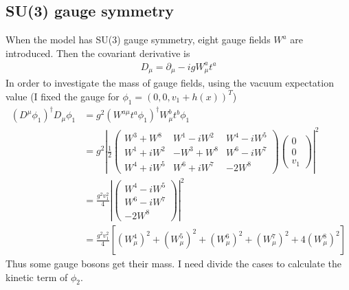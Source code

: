 \subsection{SU(3) gauge symmetry}
When the model has SU(3) gauge symmetry, eight gauge fields $W^a$ are introduced. Then the covariant derivative is
\begin{align*}
    D_{\mu}=\partial_{\mu}-igW^a_{\mu}t^a
\end{align*}
In order to investigate the mass of gauge fields, using the vacuum expectation value (I fixed the gauge for $\phi_1=(0,0,v_1+h(x))^T$)
\begin{align*}
    (D^{\mu}\phi_1)^{\dag}D_{\mu}\phi_1&=g^2(W^{a\mu}t^a\phi_1)^{\dag}W^b_{\mu}t^b\phi_1\\
    &=g^2\left|\frac{1}{2}\begin{pmatrix}
        W^3+W^8&W^1-iW^2&W^4-iW^5\\
        W^1+iW^2&-W^3+W^8&W^6-iW^7\\
        W^4+iW^5&W^6+iW^7&-2W^8
    \end{pmatrix}\begin{pmatrix}
        0\\0\\v_1
    \end{pmatrix}\right|^2\\
    &=\frac{g^2v_1^2}{4}\left|\begin{pmatrix}
        W^4-iW^5\\W^6-iW^7\\-2W^8
    \end{pmatrix}\right|^2\\
    &=\frac{g^2v_1^2}{4}\left[(W^4_{\mu})^2+(W^5_{\mu})^2+(W^6_{\mu})^2+(W^7_{\mu})^2+4(W^8_{\mu})^2\right]
\end{align*}
Thus some gauge bosons get their mass. I need divide the cases to calculate the kinetic term of $\phi_2$.

